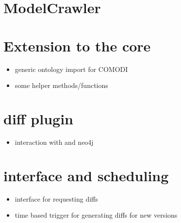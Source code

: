 
\section{ModelCrawler}

\section{Extension to the \masymos core}
	\begin{itemize}
		\item generic ontology import for COMODI
		\item some helper methods/functions
	\end{itemize}

\section{\masymos diff plugin}
	\begin{itemize}
		\item interaction with \bives and neo4j
	\end{itemize}

\section{\rest interface and scheduling}
	\begin{itemize}
		\item \rest interface for requesting diffs
		\item time based trigger for generating diffs for new versions
	\end{itemize}

